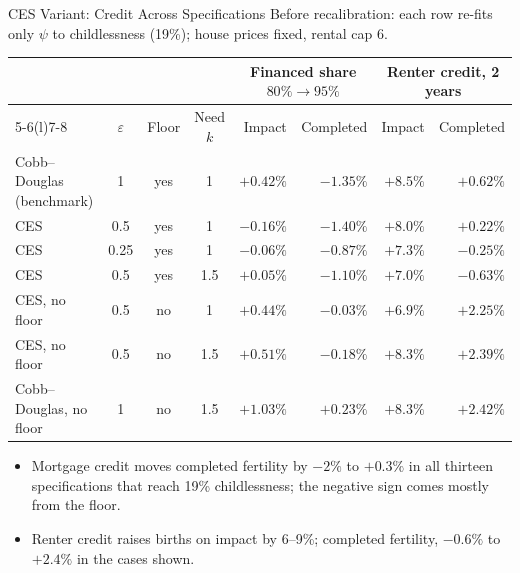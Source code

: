 \begin{frame}[t]{CES Variant: Credit Across Specifications}
\footnotesize
Before recalibration: each row re-fits only $\psi$ to childlessness (19\%); house prices fixed, rental cap 6.

\scriptsize\setlength{\tabcolsep}{4pt}\renewcommand{\arraystretch}{0.95}
\begin{tabularx}{\textwidth}{@{}Xccc rr rr@{}}
\toprule
 & & & & \multicolumn{2}{c}{Financed share $80\%\to95\%$} & \multicolumn{2}{c}{Renter credit, 2 years} \\
\cmidrule(lr){5-6}\cmidrule(l){7-8}
 & $\varepsilon$ & Floor & Need $k$ & Impact & Completed & Impact & Completed \\
\midrule
Cobb--Douglas (benchmark) & 1 & yes & 1 & $+0.42\%$ & $-1.35\%$ & $+8.5\%$ & $+0.62\%$ \\
CES & 0.5 & yes & 1 & $-0.16\%$ & $-1.40\%$ & $+8.0\%$ & $+0.22\%$ \\
CES & 0.25 & yes & 1 & $-0.06\%$ & $-0.87\%$ & $+7.3\%$ & $-0.25\%$ \\
CES & 0.5 & yes & 1.5 & $+0.05\%$ & $-1.10\%$ & $+7.0\%$ & $-0.63\%$ \\
CES, no floor & 0.5 & no & 1 & $+0.44\%$ & $-0.03\%$ & $+6.9\%$ & $+2.25\%$ \\
CES, no floor & 0.5 & no & 1.5 & $+0.51\%$ & $-0.18\%$ & $+8.3\%$ & $+2.39\%$ \\
Cobb--Douglas, no floor & 1 & no & 1.5 & $+1.03\%$ & $+0.23\%$ & $+8.3\%$ & $+2.42\%$ \\
\bottomrule
\end{tabularx}
\smallskip

\footnotesize
\begin{itemize}\setlength\itemsep{1pt}\setlength\topsep{2pt}
\item Mortgage credit moves completed fertility by $-2\%$ to $+0.3\%$ in all thirteen specifications that reach 19\% childlessness; the negative sign comes mostly from the floor.
\item Renter credit raises births on impact by 6--9\%; completed fertility, $-0.6\%$ to $+2.4\%$ in the cases shown.
\end{itemize}
\end{frame}

